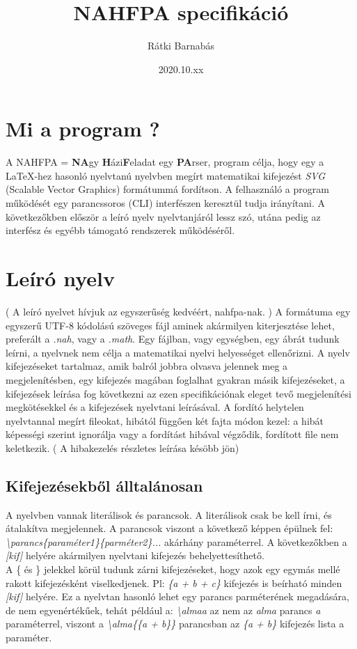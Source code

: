 \documentclass{article}[12pt,a4paper]
\title{NAHFPA specifikáció}
\author{Rátki Barnabás}
\date{2020.10.xx}
\newcommand{\lang}[1]{\textit{#1}}
\newcommand{\tbs}{\textbackslash}
\begin{document}
    \maketitle

    \tableofcontents

    \section{Mi a program ?}\label{sec:mi-a-program-?}
    A NAHFPA = \textbf{NA}gy \textbf{H}ázi\textbf{F}eladat egy \textbf{PA}rser, program célja, hogy egy a \LaTeX -hez hasonló nyelvtanú
    nyelvben megírt matematikai kifejezést \textit{SVG} (Scalable Vector Graphics) formátummá fordítson.
    A felhasználó a program működését egy parancssoros (CLI) interfészen keresztül tudja irányítani.
    A következőkben először a leíró nyelv nyelvtanjáról lessz szó, utána pedig az interfész és egyébb támogató rendszerek működéséről.

    \section{Leíró nyelv}\label{sec:leíró-nyelv}
    ( A leíró nyelvet hívjuk az egyszerűség kedvéért, nahfpa-nak. )
    A formátuma egy egyszerű UTF-8 kódolású szöveges fájl aminek akármilyen kiterjesztése lehet, preferált a \textit{.nah}, vagy a \textit{.math}.
    Egy fájlban, vagy egységben, egy ábrát tudunk leírni, a nyelvnek nem célja a matematikai nyelvi helyességet ellenőrizni.
    A nyelv kifejezéseket tartalmaz, amik balról jobbra olvasva jelennek meg a megjelenítésben, egy kifejezés magában foglalhat gyakran másik kifejezéseket,
    a kifejezések leírása fog következni az ezen specifikációnak eleget tevő megjelenítési megkötésekkel és a kifejezések nyelvtani leírásával.
    A fordító helytelen nyelvtannal megírt fileokat, hibától függően két fajta módon kezel: a hibát képességi szerint ignorálja vagy a fordítást hibával végződik, fordított file nem keletkezik.
    ( A hibakezelés részletes leírása késöbb jön)

    \subsection{Kifejezésekből álltalánosan}\label{subsec:kifejezésekből-álltalánosan}
    A nyelvben vannak literálisok és parancsok.
    A literálisok csak be kell írni, és átalakítva megjelennek.
    A parancsok viszont a következő képpen épülnek fel: \lang{\tbs parancs\{paraméter1\}\{parméter2\}...} akárhány paraméterrel.
    A következőkben a \lang{[kif]} helyére akármilyen nyelvtani kifejezés behelyettesíthető.\\
    A \{ és \} jelekkel körül tudunk zárni kifejezéseket, hogy azok egy egymás mellé rakott kifejezésként viselkedjenek.
    Pl: \lang{\{a + b + c\}} kifejezés is beírható minden \lang{[kif]} helyére.
    Ez a nyelvtan hasonló lehet egy parancs parméterének megadására, de nem egyenértékűek, tehát például a: \lang{\tbs almaa} az nem az \lang{alma} parancs \lang{a} paraméterrel,
    viszont a \lang{\tbs alma\{\{a + b\}\}} parancsban az \lang{\{a + b\}} kifejezés lista a paraméter.
\end{document}
